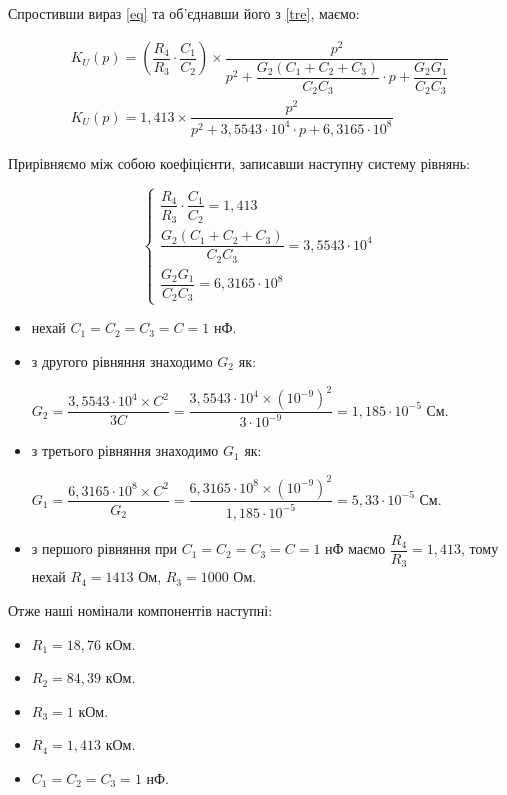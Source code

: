 \documentclass[a4paper,14pt]{extreport}
\begin{document}
Спростивши вираз \eqref{eq} та об'єднавши його з \eqref{tre}, маємо:

	\begin{equation}
	\boxed{
	\begin{aligned}
	K_U(p)=\left(\dfrac{R_4}{R_3}\cdot\dfrac{C_1}{C_2}\right)\times\dfrac{p^2}{p^2+\dfrac{G_2(C_1+C_2+C_3)}{C_2C_3}\cdot p+\dfrac{G_2G_1}{C_2C_3}}\\[0.5cm]
	K_U(p)=1,413\times\dfrac{p^2}{p^2+3,5543\cdot{10^4}\cdot p+6,3165\cdot{10^8}}
	\end{aligned}}
	\end{equation}

Прирівняємо між собою коефіцієнти, записавши наступну систему рівнянь:

	\begin{equation*}
	\begin{cases}
	\dfrac{R_4}{R_3}\cdot\dfrac{C_1}{C_2}=1,413\\[0.5cm]
	\dfrac{G_2(C_1+C_2+C_3)}{C_2C_3}=3,5543\cdot{10^4}\\[0.5cm]
	\dfrac{G_2G_1}{C_2C_3}=6,3165\cdot{10^8}
	\end{cases}
	\end{equation*}
\newpage
	\begin{itemize}
	\item нехай $C_1=C_2=C_3=C=1$ нФ.
	\item з другого рівняння знаходимо $G_2$ як:
	\begin{center}
	$G_2=\dfrac{3,5543\cdot{10^4}\times C^2}{3C}=\dfrac{3,5543\cdot{10^4}\times \left(10^{-9}\right)^2}{3\cdot{10^{-9}}}=1,185\cdot{10^{-5}}$ См.
	\end{center}
	\item з третього рівняння знаходимо $G_1$ як:
	\begin{center}
	$G_1=\dfrac{6,3165\cdot{10^8}\times{C^2}}{G_2}=\dfrac{6,3165\cdot{10^8}\times{\left(10^{-9}\right)^2}}{1,185\cdot{10^{-5}}}=5,33\cdot{10^{-5}}$ См.
	\end{center}
	\item з першого рівняння при $C_1=C_2=C_3=C=1$ нФ маємо $\dfrac{R_4}{R_3}=1,413$, тому нехай $R_4=1413$ Ом, $R_3=1000$ Ом.
	\end{itemize}
	
	Отже наші номінали компонентів наступні:
	\begin{itemize}
	\item $R_1=18,76$ кОм.
	\item $R_2=84,39$ кОм.
	\item $R_3=1$ кОм.
	\item $R_4=1,413$ кОм.
	\item $C_1=C_2=C_3=1$ нФ.
	\end{itemize}
\end{document}

